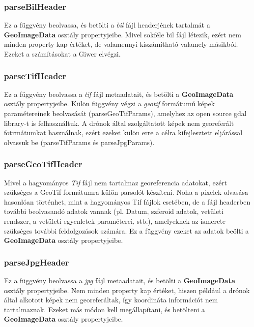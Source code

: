 \documentclass[a4paper,12pt]{article}
\begin{document}
\subsubsection{parseBilHeader}

Ez a függvény beolvassa, és betölti a \textit{bil} fájl headerjének tartalmát a \textbf{GeoImageData} osztály propertyjeibe. Mivel sokféle bil fájl létezik, ezért nem minden property kap értéket, de valamennyi kiszámítható valamely másikból. Ezeket a számításokat a Giwer elvégzi.

\subsubsection{parseTifHeader}

Ez a függvény beolvassa a \textit{tif} fájl metaadatait, és betölti a \textbf{GeoImageData} osztály propertyjeibe. Külön függvény végzi a \textit{geotif} formátumú képek paramétereinek beolvasását (parseGeoTifParams), amelyhez az open source gdal library-t is felhasználtuk. A drónok által szolgáltatott képek nem georeferált fotrmátumkat használnak, ezért ezeket külön erre a célra kifejlesztett eljárással olvassuk be (parseTifParams és parseJpgParams).


\subsubsection{parseGeoTifHeader}

Mivel a hagyományos \textit{Tif} fájl nem tartalmaz georeferencia adatokat, ezért szükséges a GeoTif formátumra külön parsolót készíteni. Noha a pixelek olvasása hasonlóan történhet, mint a hagyományos Tif fájlok esetében, de a fájl headerben további beolvasandó adatok vannak (pl. Datum, szferoid adatok, vetületi rendszer, a vetületi egyenletek paraméterei, stb.), amelyeknek az ismerete szükséges további feldolgozások számára. Ez a függvény ezeket az adatok beölti  a \textbf{GeoImageData} osztály propertyjeibe.

\subsubsection{parseJpgHeader}

Ez a függvény beolvassa a \textit{jpg} fájl metaadatait, és betölti a \textbf{GeoImageData} osztály propertyjeibe. Nem minden property kap értéket, hiszen például a drónok által alkotott képek nem georeferáltak, így koordináta információt nem tartalmaznak. Ezeket más módon kell megállapítani, és betölteni a \textbf{GeoImageData} osztály propertyjeibe.
\end{document}

